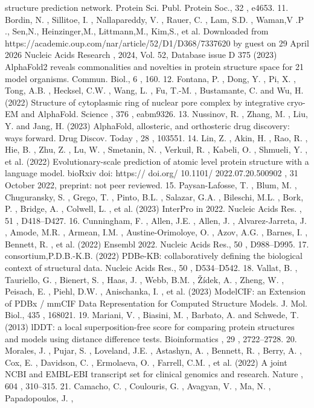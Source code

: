 structure prediction network. Protein Sci. Publ. Protein Soc., 32 ,
e4653.
11. Bordin, N. , Sillitoe, I. , Nallapareddy, V. , Rauer, C. , Lam, S.D. ,
Waman,V .P ., Sen,N., Heinzinger,M., Littmann,M., Kim,S., et al.
Downloaded from https://academic.oup.com/nar/article/52/D1/D368/7337620 by guest on 29 April 2026
Nucleic Acids Research , 2024, Vol. 52, Database issue
D 375
(2023) AlphaFold2 reveals commonalities and novelties in protein
structure space for 21 model organisms. Commun. Biol., 6 , 160.
12. Fontana, P. , Dong, Y. , Pi, X. , Tong, A.B. , Hecksel, C.W. , Wang, L. ,
Fu, T.-M. , Bustamante, C. and Wu, H. (2022) Structure of
cytoplasmic ring of nuclear pore complex by integrative cryo-EM
and AlphaFold. Science , 376 , eabm9326.
13. Nussinov, R. , Zhang, M. , Liu, Y. and Jang, H. (2023) AlphaFold,
allosteric, and orthosteric drug discovery: ways forward. Drug
Discov. Today , 28 , 103551.
14. Lin, Z. , Akin, H. , Rao, R. , Hie, B. , Zhu, Z. , Lu, W. , Smetanin, N. ,
Verkuil, R. , Kabeli, O. , Shmueli, Y. , et al. (2022) Evolutionary-scale
prediction of atomic level protein structure with a language model.
bioRxiv doi: https:// doi.org/ 10.1101/ 2022.07.20.500902 , 31
October 2022, preprint: not peer reviewed.
15. Paysan-Lafosse, T. , Blum, M. , Chuguransky, S. , Grego, T. , Pinto, B.L. ,
Salazar, G.A. , Bileschi, M.L. , Bork, P. , Bridge, A. , Colwell, L. , et al.
(2023) InterPro in 2022. Nucleic Acids Res. , 51 , D418–D427.
16. Cunningham, F. , Allen, J.E. , Allen, J. , Alvarez-Jarreta, J. ,
Amode, M.R. , Armean, I.M. , Austine-Orimoloye, O. , Azov, A.G. ,
Barnes, I. , Bennett, R. , et al. (2022) Ensembl 2022. Nucleic Acids
Res., 50 , D988–D995.
17. consortium,P.D.B.-K.B. (2022) PDBe-KB: collaboratively defining
the biological context of structural data. Nucleic Acids Res., 50 ,
D534–D542.
18. Vallat, B. , Tauriello, G. , Bienert, S. , Haas, J. , Webb, B.M. , Žídek, A. ,
Zheng, W. , Peisach, E. , Piehl, D.W. , Anischanka, I. , et al. (2023)
ModelCIF: an Extension of PDBx / mmCIF Data Representation
for Computed Structure Models. J. Mol. Biol., 435 , 168021.
19. Mariani, V. , Biasini, M. , Barbato, A. and Schwede, T. (2013) lDDT: a
local superposition-free score for comparing protein structures and
models using distance difference tests. Bioinformatics , 29 ,
2722–2728.
20. Morales, J. , Pujar, S. , Loveland, J.E. , Astashyn, A. , Bennett, R. ,
Berry, A. , Cox, E. , Davidson, C. , Ermolaeva, O. , Farrell, C.M. , et al.
(2022) A joint NCBI and EMBL-EBI transcript set for clinical
genomics and research. Nature , 604 , 310–315.
21. Camacho, C. , Coulouris, G. , Avagyan, V. , Ma, N. , Papadopoulos, J. ,
